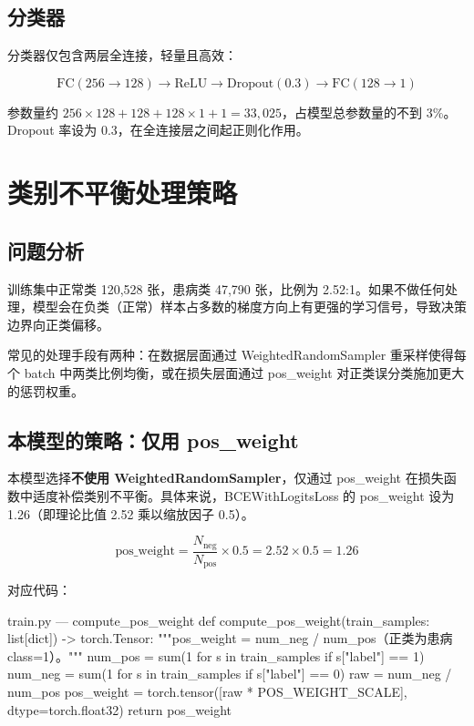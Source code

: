 \documentclass[12pt,a4paper]{ctexart}
\begin{document}
\subsection{分类器}

分类器仅包含两层全连接，轻量且高效：

\[
\text{FC}(256 \rightarrow 128) \rightarrow \text{ReLU} \rightarrow \text{Dropout}(0.3) \rightarrow \text{FC}(128 \rightarrow 1)
\]

参数量约 $256 \times 128 + 128 + 128 \times 1 + 1 = 33,\!025$，占模型总参数量的不到 3\%。Dropout 率设为 0.3，在全连接层之间起正则化作用。

\section{类别不平衡处理策略}

\subsection{问题分析}

训练集中正常类 120,528 张，患病类 47,790 张，比例为 2.52:1。如果不做任何处理，模型会在负类（正常）样本占多数的梯度方向上有更强的学习信号，导致决策边界向正类偏移。

常见的处理手段有两种：在数据层面通过 WeightedRandomSampler 重采样使得每个 batch 中两类比例均衡，或在损失层面通过 pos\_weight 对正类误分类施加更大的惩罚权重。

\subsection{本模型的策略：仅用 pos\_weight}

本模型选择\textbf{不使用 WeightedRandomSampler}，仅通过 pos\_weight 在损失函数中适度补偿类别不平衡。具体来说，BCEWithLogitsLoss 的 pos\_weight 设为 1.26（即理论比值 2.52 乘以缩放因子 0.5）。

\[
\text{pos\_weight} = \frac{N_{\text{neg}}}{N_{\text{pos}}} \times 0.5 = 2.52 \times 0.5 = 1.26
\]

对应代码：

\begin{pythoncode}{train.py — compute\_pos\_weight}
def compute_pos_weight(train_samples: list[dict]) -> torch.Tensor:
    """pos_weight = num_neg / num_pos（正类为患病 class=1）。"""
    num_pos = sum(1 for s in train_samples if s["label"] == 1)
    num_neg = sum(1 for s in train_samples if s["label"] == 0)
    raw = num_neg / num_pos
    pos_weight = torch.tensor([raw * POS_WEIGHT_SCALE], dtype=torch.float32)
    return pos_weight
\end{pythoncode}
\end{document}
